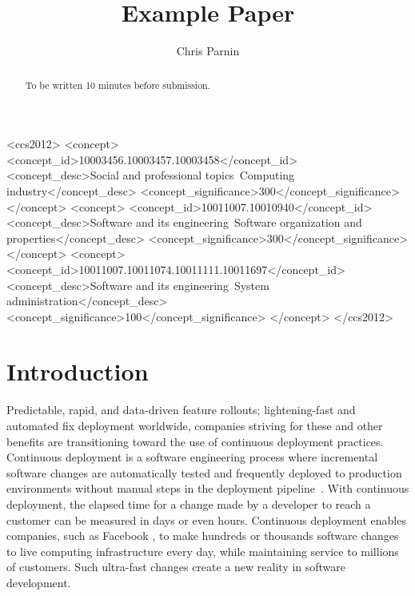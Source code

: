\documentclass[manuscript, review, screen]{acmart}
\begin{document}
\title{Example Paper}


\author{Chris Parnin}

\begin{abstract}
To be written 10 minutes before submission.
\end{abstract}


%
%
\begin{CCSXML}
<ccs2012>
<concept>
<concept_id>10003456.10003457.10003458</concept_id>
<concept_desc>Social and professional topics~Computing industry</concept_desc>
<concept_significance>300</concept_significance>
</concept>
<concept>
<concept_id>10011007.10010940</concept_id>
<concept_desc>Software and its engineering~Software organization and properties</concept_desc>
<concept_significance>300</concept_significance>
</concept>
<concept>
<concept_id>10011007.10011074.10011111.10011697</concept_id>
<concept_desc>Software and its engineering~System administration</concept_desc>
<concept_significance>100</concept_significance>
</concept>
</ccs2012>
\end{CCSXML}

%
%





\maketitle

\section{Introduction}

Predictable, rapid, and data-driven feature rollouts; lightening-fast and automated fix deployment{\textemdash} worldwide, companies striving for these and other benefits are transitioning toward the use of continuous deployment practices.  Continuous deployment is a software engineering process where incremental software changes are automatically tested and frequently deployed to production environments without manual steps in the deployment pipeline~\cite{Rahman:2015}. With continuous deployment, the elapsed time for a change made by a developer to reach a customer can be measured in days or even hours. Continuous deployment enables companies, such as Facebook \cite{Facebook_2016}, to make hundreds or thousands software changes to live computing infrastructure every day, while maintaining service to millions of customers.  Such ultra-fast changes create a new reality in software development.  
\end{document}
